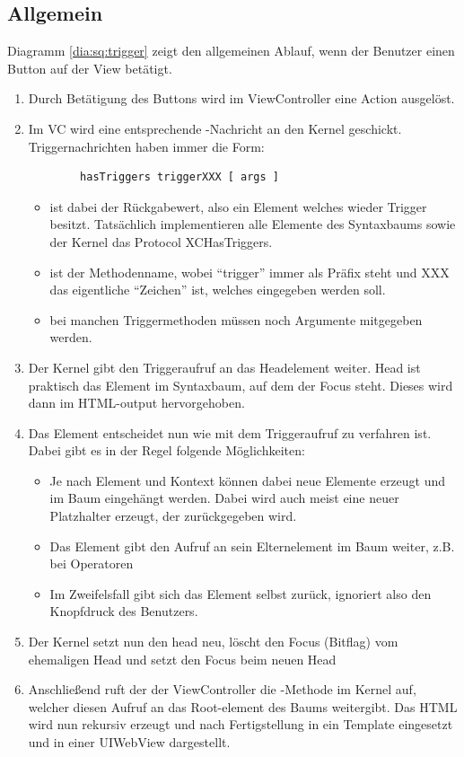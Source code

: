 \subsection{Allgemein}
Diagramm \ref{dia:sq:trigger} zeigt den allgemeinen Ablauf, wenn der Benutzer einen Button auf der View betätigt.
\begin{enumerate}
	\item Durch Betätigung des Buttons wird im ViewController eine Action ausgelöst.
	\item Im VC wird eine entsprechende -Nachricht an den Kernel geschickt.
		Triggernachrichten haben immer die Form:
		\begin{lstlisting}
		hasTriggers triggerXXX [ args ]
	\end{lstlisting}
	\begin{itemize}
		\item {} ist dabei der Rückgabewert, also ein Element welches wieder Trigger besitzt. Tatsächlich implementieren alle Elemente des Syntaxbaums sowie der Kernel das Protocol XCHasTriggers. 
		\item {} ist der Methodenname, wobei ``trigger'' immer als Präfix steht und XXX das eigentliche ``Zeichen'' ist, welches eingegeben werden soll.
		\item \code{[ args ]} bei manchen Triggermethoden müssen noch Argumente mitgegeben werden.
	\end{itemize}
\item Der Kernel gibt den Triggeraufruf an das Headelement weiter. Head ist praktisch das Element im Syntaxbaum, auf dem der Focus steht. Dieses wird dann im HTML-output hervorgehoben.
\item Das Element entscheidet nun wie mit dem Triggeraufruf zu verfahren ist. 
	Dabei gibt es in der Regel folgende Möglichkeiten:
	\begin{itemize}
		\item Je nach Element und Kontext können dabei neue Elemente erzeugt und im Baum eingehängt werden. Dabei wird auch meist eine neuer Platzhalter erzeugt, der zurückgegeben wird. 
		\item Das Element gibt den Aufruf an sein Elternelement im Baum weiter, z.B. bei Operatoren
		\item Im Zweifelsfall gibt sich das Element selbst zurück, ignoriert also den Knopfdruck des Benutzers.
	\end{itemize}
\item Der Kernel setzt nun den head neu, löscht den Focus (Bitflag) vom ehemaligen Head und setzt den Focus beim neuen Head
\item Anschließend ruft der der ViewController die -Methode im Kernel auf, welcher diesen Aufruf an das Root-element des Baums weitergibt. Das HTML wird nun rekursiv erzeugt und nach Fertigstellung in ein Template eingesetzt und in einer UIWebView dargestellt.
\end{enumerate}


